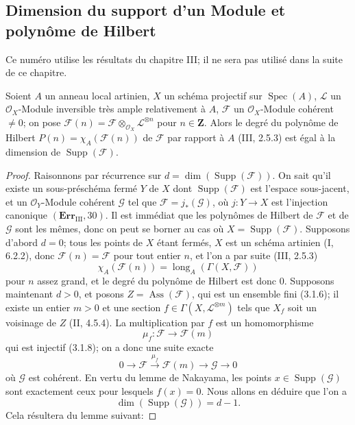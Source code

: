 \subsection{Dimension du support d'un Module et polynôme de Hilbert}
\label{IV.2.s5.3-fr}


Ce numéro utilise les résultats du chapitre III; il ne sera pas utilisé dans la
suite de ce chapitre.

\begin{proposition}[5.3.1]
\label{IV.2.s5.3.1-fr}
Soient $A$ un anneau local artinien, $X$ un schéma projectif sur
$\operatorname{Spec}(A)$, $\mathcal L$ un $\mathcal O_X$-Module inversible
très ample relativement à $A$, $\mathcal F$ un $\mathcal O_X$-Module cohérent
$\ne0$; on pose
$\mathcal F(n)=\mathcal F\otimes_{\mathcal O_X}\mathcal L^{\otimes n}$ pour
$n\in\mathbf Z$. Alors le degré du polynôme de Hilbert
$P(n)=\chi_A(\mathcal F(n))$ de $\mathcal F$ par rapport à $A$ (III, 2.5.3)
est égal à la dimension de $\operatorname{Supp}(\mathcal F)$.
\end{proposition}

\begin{proof}
Raisonnons par récurrence sur
$d=\dim(\operatorname{Supp}(\mathcal F))$. On sait qu'il existe un
sous-préschéma fermé $Y$ de $X$ dont $\operatorname{Supp}(\mathcal F)$ est
l'espace sous-jacent, et un $\mathcal O_Y$-Module cohérent $\mathcal G$ tel
que $\mathcal F=j_*(\mathcal G)$, où $j:Y\to X$ est l'injection canonique
$(\mathbf{Err}_{\mathrm{III}},30)$. Il est immédiat que les polynômes de
Hilbert de $\mathcal F$ et de $\mathcal G$ sont les mêmes, donc on peut se
borner au cas où $X=\operatorname{Supp}(\mathcal F)$. Supposons d'abord
$d=0$; tous les points de $X$ étant fermés, $X$ est un schéma artinien
(I, 6.2.2), donc $\mathcal F(n)=\mathcal F$ pour tout entier $n$, et l'on a
par suite (III, 2.5.3)
\[
\chi_A(\mathcal F(n))=\operatorname{long}_A(\Gamma(X,\mathcal F))
\]
pour $n$ assez grand, et le degré du polynôme de Hilbert est donc $0$.
Supposons maintenant $d>0$, et posons
$Z=\operatorname{Ass}(\mathcal F)$, qui est un ensemble fini (3.1.6); il
existe un entier $m>0$ et une section
$f\in\Gamma(X,\mathcal L^{\otimes m})$ tels que $X_f$ soit un voisinage de
$Z$ (II, 4.5.4). La multiplication par $f$ est un homomorphisme
\[
\mu_f:\mathcal F\longrightarrow\mathcal F(m)
\]
qui est injectif (3.1.8); on a donc une suite exacte
\begin{equation}
0\longrightarrow\mathcal F\xrightarrow{\mu_f}\mathcal F(m)
\longrightarrow\mathcal G\longrightarrow0
\tag{5.3.1.1}\label{IV.2.s5.3.1.1-fr}
\end{equation}
où $\mathcal G$ est cohérent. En vertu du lemme de Nakayama, les points
$x\in\operatorname{Supp}(\mathcal G)$ sont exactement ceux pour lesquels
$f(x)=0$. Nous allons en déduire que l'on a
\begin{equation}
\dim(\operatorname{Supp}(\mathcal G))=d-1.
\tag{5.3.1.2}\label{IV.2.s5.3.1.2-fr}
\end{equation}
Cela résultera du lemme suivant:
\end{proof}

